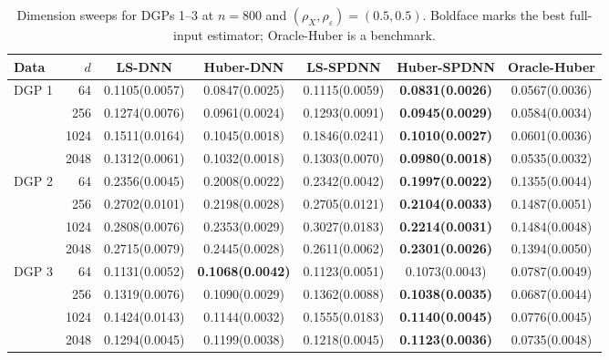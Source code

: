 \begin{table}[!ht]
\centering
\caption{Dimension sweeps for DGPs 1--3 at $n=800$ and $(\rho_X,\rho_\varepsilon)=(0.5,0.5)$. Boldface marks the best full-input estimator; Oracle-Huber is a benchmark.}
\label{tab:dimension-abc}
\begin{adjustbox}{max width=\linewidth}
\begin{tabular}{@{}lrccccc@{}}
\toprule
Data & $d$ & LS-DNN & Huber-DNN & LS-SPDNN & Huber-SPDNN & Oracle-Huber\\
\midrule
\multirow{4}{*}{DGP 1} & 64 & 0.1105(0.0057) & 0.0847(0.0025) & 0.1115(0.0059) & \textbf{0.0831(0.0026)} & 0.0567(0.0036)\\
 & 256 & 0.1274(0.0076) & 0.0961(0.0024) & 0.1293(0.0091) & \textbf{0.0945(0.0029)} & 0.0584(0.0034)\\
 & 1024 & 0.1511(0.0164) & 0.1045(0.0018) & 0.1846(0.0241) & \textbf{0.1010(0.0027)} & 0.0601(0.0036)\\
 & 2048 & 0.1312(0.0061) & 0.1032(0.0018) & 0.1303(0.0070) & \textbf{0.0980(0.0018)} & 0.0535(0.0032)\\
\midrule
\multirow{4}{*}{DGP 2} & 64 & 0.2356(0.0045) & 0.2008(0.0022) & 0.2342(0.0042) & \textbf{0.1997(0.0022)} & 0.1355(0.0044)\\
 & 256 & 0.2702(0.0101) & 0.2198(0.0028) & 0.2705(0.0121) & \textbf{0.2104(0.0033)} & 0.1487(0.0051)\\
 & 1024 & 0.2808(0.0076) & 0.2353(0.0029) & 0.3027(0.0183) & \textbf{0.2214(0.0031)} & 0.1484(0.0048)\\
 & 2048 & 0.2715(0.0079) & 0.2445(0.0028) & 0.2611(0.0062) & \textbf{0.2301(0.0026)} & 0.1394(0.0050)\\
\midrule
\multirow{4}{*}{DGP 3} & 64 & 0.1131(0.0052) & \textbf{0.1068(0.0042)} & 0.1123(0.0051) & 0.1073(0.0043) & 0.0787(0.0049)\\
 & 256 & 0.1319(0.0076) & 0.1090(0.0029) & 0.1362(0.0088) & \textbf{0.1038(0.0035)} & 0.0687(0.0044)\\
 & 1024 & 0.1424(0.0143) & 0.1144(0.0032) & 0.1555(0.0183) & \textbf{0.1140(0.0045)} & 0.0776(0.0045)\\
 & 2048 & 0.1294(0.0045) & 0.1199(0.0038) & 0.1218(0.0045) & \textbf{0.1123(0.0036)} & 0.0735(0.0048)\\
\bottomrule
\end{tabular}
\end{adjustbox}
\end{table}

